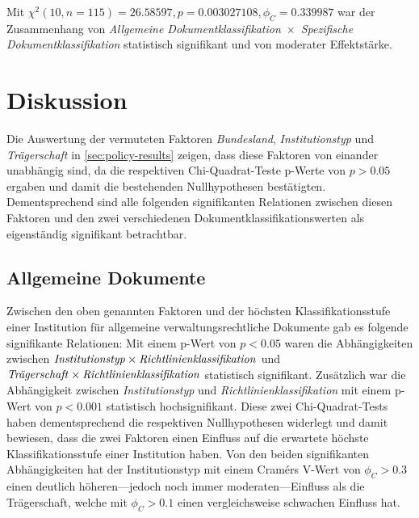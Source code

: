Mit $\chi^2 (\num{10}, n=\num{115}) = \num[round-mode=places,round-precision=2]{26,58597}, p = \num[round-mode=places,round-precision=3]{0,003027108},\phi_C=\num[round-mode=places,round-precision=2]{0.339987}$ war der Zusammenhang von \textit{Allgemeine Dokumentklassifikation}~$\times$~\textit{Spezifische Dokumentklassifikation} statistisch signifikant und von moderater Effektstärke.


\section{Diskussion}\label{sec:policy-discussion}
Die Auswertung der vermuteten Faktoren \textit{Bundesland}, \textit{Institutionstyp} und \textit{Trägerschaft} in \cref{sec:policy-results} zeigen, dass diese Faktoren von einander unabhängig sind, da die respektiven Chi-Quadrat-Teste p-Werte von $p>\num{0,05}$ ergaben und damit die bestehenden Nullhypothesen bestätigten.
Dementsprechend sind alle folgenden signifikanten Relationen zwischen diesen Faktoren und den zwei verschiedenen Dokumentklassifikationswerten als eigenständig signifikant betrachtbar.

\subsection{Allgemeine Dokumente}\label{sec:policy-discussion-general}
Zwischen den oben genannten Faktoren und der höchsten Klassifikationsstufe einer Institution für allgemeine verwaltungsrechtliche Dokumente gab es folgende signifikante Relationen:
Mit einem p-Wert von $p<\num{0,05}$ waren die Abhängigkeiten zwischen $\text{\textit{Institutionstyp}}\times\text{\textit{Richtlinienklassifikation}}$ und $\text{\textit{Trägerschaft}}\times\text{\textit{Richtlinienklassifikation}}$ statistisch signifikant.
Zusätzlich war die Abhängigkeit zwischen \textit{Institutionstyp} und \textit{Richtlinienklassifikation} mit einem p-Wert von $p<\num{0,001}$ statistisch hochsignifikant.
Diese zwei Chi-Quadrat-Tests haben dementsprechend die respektiven Nullhypothesen widerlegt und damit bewiesen, dass die zwei Faktoren einen Einfluss auf die erwartete höchste Klassifikationsstufe einer Institution haben.
Von den beiden signifikanten Abhängigkeiten hat der Institutionstyp mit einem Cramérs V-Wert von $\phi_C>\num{0.3}$ einen deutlich höheren---jedoch noch immer moderaten---Einfluss als die Trägerschaft, welche mit $\phi_C>\num{0.1}$ einen vergleichsweise schwachen Einfluss hat.

